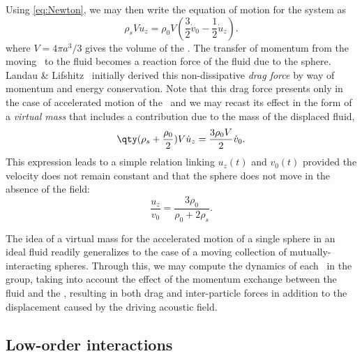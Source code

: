 Using \cref{eq:Newton}, we may then write the equation of motion for the system as
\begin{equation}
  \rho_s V \dot{u}_z = \rho_0 V \left(\frac{3}{2}\dot{v}_0 - \frac{1}{2}\dot{u}_z\right).
\end{equation}
where $V = 4\pi a^3/3$ gives the volume of the \bubble.
The transfer of momentum from the moving \bubble\ to the fluid becomes a reaction force of the fluid due to the sphere.
Landau \& Lifshitz~\cite{Landau2013} initially derived this non-dissipative \emph{drag force} by way of momentum and energy conservation.
Note that this drag force presents only in the case of accelerated motion of the \bubble\ and we may recast its effect in the form of a \emph{virtual mass} that includes a contribution due to the mass of the displaced fluid,
\begin{equation}
  \qty(\rho_s + \frac{\rho_0}{2})V \dot{u}_z = \frac{3\rho_0 V}{2} \dot{v}_0.
\end{equation}
This expression leads to a simple relation linking $u_z(t)$ and $v_0(t)$ provided the velocity does not remain constant and that the sphere does not move in the absence of the field:
\begin{equation}
  \label{eq:landau result}
  \frac{u_z}{v_0} = \frac{3\rho_0}{\rho_0 + 2\rho_s}.
\end{equation}

The idea of a virtual mass for the accelerated motion of a single sphere in an ideal fluid readily generalizes to the case of a moving collection of mutually-interacting spheres.
Through this, we may compute the dynamics of each \bubble\ in the group, taking into account the effect of the momentum exchange between the fluid and the \bubbles, resulting in both drag and inter-particle forces in addition to the displacement caused by the driving acoustic field.

\subsection{Low-order interactions}

